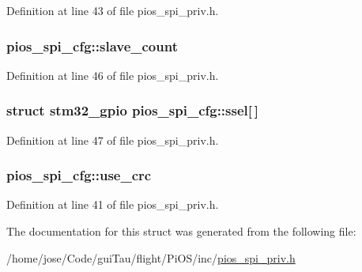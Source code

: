 Definition at line 43 of file pios\-\_\-spi\-\_\-priv.\-h.

\hypertarget{structpios__spi__cfg_ad45aed059de6082ab6c257da0018d867}{
\subsubsection[{slave\-\_\-count}]{ pios\-\_\-spi\-\_\-cfg\-::slave\-\_\-count}}\label{structpios__spi__cfg_ad45aed059de6082ab6c257da0018d867}


Definition at line 46 of file pios\-\_\-spi\-\_\-priv.\-h.

\hypertarget{structpios__spi__cfg_ac1c73f49ee01a82a50dff4f2eb0fbb8e}{
\subsubsection[{ssel}]{\setlength{\rightskip}{0pt plus 5cm}struct {\bf stm32\-\_\-gpio} pios\-\_\-spi\-\_\-cfg\-::ssel\mbox{[}$\,$\mbox{]}}}\label{structpios__spi__cfg_ac1c73f49ee01a82a50dff4f2eb0fbb8e}


Definition at line 47 of file pios\-\_\-spi\-\_\-priv.\-h.

\hypertarget{structpios__spi__cfg_a0ec6229d3970d89ba04dfe718bb68607}{
\subsubsection[{use\-\_\-crc}]{ pios\-\_\-spi\-\_\-cfg\-::use\-\_\-crc}}\label{structpios__spi__cfg_a0ec6229d3970d89ba04dfe718bb68607}


Definition at line 41 of file pios\-\_\-spi\-\_\-priv.\-h.



The documentation for this struct was generated from the following file\-:\begin{DoxyCompactItemize}
\item 
/home/jose/\-Code/gui\-Tau/flight/\-Pi\-O\-S/inc/\hyperlink{pios__spi__priv_8h}{pios\-\_\-spi\-\_\-priv.\-h}\end{DoxyCompactItemize}

